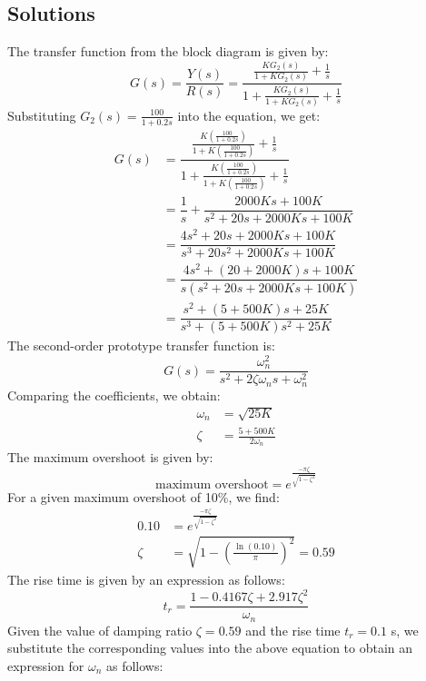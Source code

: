 \documentclass[11pt]{article}
\begin{document}
\subsection*{Solutions}
The transfer function from the block diagram is given by:
\begin{equation*}
G(s) = \frac{Y(s)}{R(s)} = \frac{\frac{KG_2(s)}{1+KG_2(s)} + \frac{1}{s}}{1+ \frac{KG_2(s)}{1+KG_2(s)} + \frac{1}{s}}
\end{equation*}
Substituting \(G_2(s) = \frac{100}{1+0.2s}\) into the equation, we get:
\begin{align*}
G(s) &= \dfrac{\frac{K \left( \frac{100}{1+0.2s} \right)}{1+K \left( \frac{100}{1+0.2s} \right)} + \frac{1}{s}}{1 + \frac{K \left( \frac{100}{1+0.2s} \right)}{1+K \left( \frac{100}{1+0.2s} \right)} + \frac{1}{s}} \\
&= \dfrac{1}{s} + \dfrac{2000Ks + 100K}{s^2 + 20s + 2000Ks +100K} \\
&= \dfrac{4s^2 + 20s + 2000Ks +100K}{s^3 + 20s^2 + 2000Ks +100K} \\
&= \dfrac{4s^2 + (20+2000K)s +100K}{s(s^2 + 20s + 2000Ks +100K)} \\
&= \dfrac{s^2 + (5+500K)s + 25K}{s^3 + (5+500K)s^2 + 25K}
\end{align*}
The second-order prototype transfer function is:
\begin{equation*}
G(s) = \frac{\omega_n^2}{s^2 + 2\zeta\omega_n s + \omega_n^2}
\end{equation*}
Comparing the coefficients, we obtain:
\begin{align*}
\omega_n &= \sqrt{25K} \\
\zeta &= \frac{5+500K}{2\omega_n}
\end{align*}
The maximum overshoot is given by:
\begin{equation*}
\text{maximum overshoot} = e^{\frac{-\pi\zeta}{\sqrt{1-\zeta^2}}}
\end{equation*}
For a given maximum overshoot of 10\%, we find:
\begin{align*}
0.10 &= e^{\frac{-\pi\zeta}{\sqrt{1-\zeta^2}}} \\
\zeta &= \sqrt{1-\left(\frac{\ln(0.10)}{\pi}\right)^2} = 0.59
\end{align*}
The rise time is given by an expression as follows:
\begin{equation*}
t_r = \frac{1 - 0.4167 \zeta + 2.917 \zeta^2}{\omega_n}
\end{equation*}
Given the value of damping ratio \( \zeta = 0.59 \) and the rise time \( t_r = 0.1 \) s, we substitute the corresponding values into the above equation to obtain an expression for \( \omega_n \) as follows:
\end{document}
